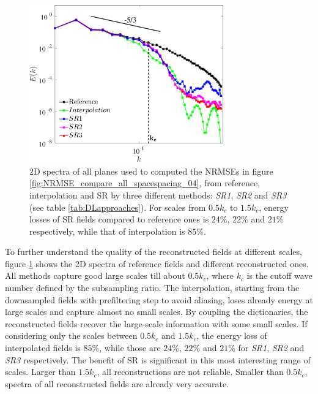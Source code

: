\begin{figure}
	\centering
	\includegraphics[width=0.75\textwidth]{./images/DL/SR_sspacing04/downsampling/spectra2d_spacespacing_04.eps}
	\caption{2D spectra of all planes used to computed the NRMSEs in figure \ref{fig:NRMSE_compare_all_spacespacing_04}, from reference, interpolation and SR by three different methods: \textit{SR1}, \textit{SR2} and \textit{SR3} (see table \ref{tab:DLapproaches}). For scales from $ 0.5k_c $ to $ 1.5 k_c$, energy losses of SR fields compared to reference ones is $ 24\% $, $ 22\% $ and $ 21\% $ respectively, while that of interpolation is $85 \% $.}
	\label{fig:spectra2d_spacespacing_04}
\end{figure}

To further understand the quality of the reconstructed fields at different scales, figure \ref{fig:spectra2d_spacespacing_04} shows the 2D spectra of reference fields and different reconstructed ones. All methods capture good large scales till about $ 0.5 k_c $, where $ k_c $ is the cutoff wave number defined by the subsampling ratio. The interpolation, starting from the downsampled fields with prefiltering step to avoid aliasing, loses already energy at large scales and capture almost no small scales. By coupling the dictionaries, the reconstructed fields recover the large-scale information with some small scales. If considering only the scales between $ 0.5k_c $ and $ 1.5k_c $, the energy loss of interpolated fields is $ 85\% $, while those are $ 24\% $, $ 22\% $ and $ 21\% $  for \textit{SR1}, \textit{SR2} and \textit{SR3} respectively. The benefit of SR is significant in this most interesting range of scales. Larger than $ 1.5k_c $, all reconstructions are not reliable. Smaller than $ 0.5 k_c $, spectra of all reconstructed fields are already very accurate. 

